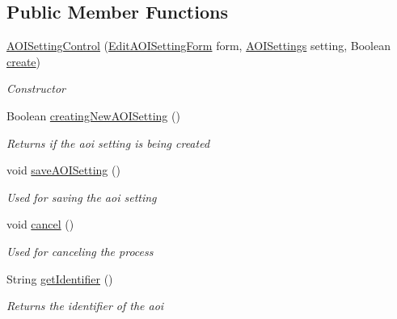 \subsection*{Public Member Functions}
\begin{DoxyCompactItemize}
\item 
\hyperlink{class_web_analyzer_1_1_u_i_1_1_interaction_objects_1_1_a_o_i_setting_control_aba590b033948b15906956ea0314f6e46}{A\+O\+I\+Setting\+Control} (\hyperlink{class_web_analyzer_1_1_u_i_1_1_edit_a_o_i_setting_form}{Edit\+A\+O\+I\+Setting\+Form} form, \hyperlink{class_web_analyzer_1_1_models_1_1_settings_model_1_1_a_o_i_settings}{A\+O\+I\+Settings} setting, Boolean \hyperlink{_u_i_2_h_t_m_l_resources_2js_2lib_2underscore_8min_8js_a8bd5981157799459d39a59e8c4a0de04}{create})
\begin{DoxyCompactList}\small\item\em Constructor \end{DoxyCompactList}\item 
Boolean \hyperlink{class_web_analyzer_1_1_u_i_1_1_interaction_objects_1_1_a_o_i_setting_control_a298902c1d52470da4a0141819e55eb4d}{creating\+New\+A\+O\+I\+Setting} ()
\begin{DoxyCompactList}\small\item\em Returns if the aoi setting is being created \end{DoxyCompactList}\item 
void \hyperlink{class_web_analyzer_1_1_u_i_1_1_interaction_objects_1_1_a_o_i_setting_control_a7d895c94dcd8a3c65249aa6721ae81c8}{save\+A\+O\+I\+Setting} ()
\begin{DoxyCompactList}\small\item\em Used for saving the aoi setting \end{DoxyCompactList}\item 
void \hyperlink{class_web_analyzer_1_1_u_i_1_1_interaction_objects_1_1_a_o_i_setting_control_a2c0ef2d343a35ab51285bf4f1f782a18}{cancel} ()
\begin{DoxyCompactList}\small\item\em Used for canceling the process \end{DoxyCompactList}\item 
String \hyperlink{class_web_analyzer_1_1_u_i_1_1_interaction_objects_1_1_a_o_i_setting_control_af075fa96759a677d9e973b26778981cf}{get\+Identifier} ()
\begin{DoxyCompactList}\small\item\em Returns the identifier of the aoi \end{DoxyCompactList}\item 

\end{DoxyCompactItemize}
